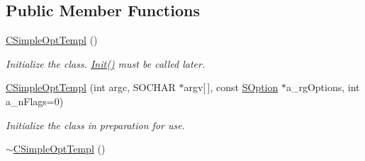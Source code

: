 \subsection*{Public Member Functions}
\begin{DoxyCompactItemize}
\item 
\hypertarget{class_c_simple_opt_templ_a901dd8e44e4b1662dea6991478574517}{\hyperlink{class_c_simple_opt_templ_a901dd8e44e4b1662dea6991478574517}{C\-Simple\-Opt\-Templ} ()}\label{class_c_simple_opt_templ_a901dd8e44e4b1662dea6991478574517}

\begin{DoxyCompactList}\small\item\em Initialize the class. \hyperlink{class_c_simple_opt_templ_a295504063bf4b5cb259541581ee46bfc}{Init()} must be called later. \end{DoxyCompactList}\item 
\hypertarget{class_c_simple_opt_templ_a743811eb95a173a9208c6a6b77298085}{\hyperlink{class_c_simple_opt_templ_a743811eb95a173a9208c6a6b77298085}{C\-Simple\-Opt\-Templ} (int argc, S\-O\-C\-H\-A\-R $\ast$argv\mbox{[}$\,$\mbox{]}, const \hyperlink{struct_c_simple_opt_templ_1_1_s_option}{S\-Option} $\ast$a\-\_\-rg\-Options, int a\-\_\-n\-Flags=0)}\label{class_c_simple_opt_templ_a743811eb95a173a9208c6a6b77298085}

\begin{DoxyCompactList}\small\item\em Initialize the class in preparation for use. \end{DoxyCompactList}\item 
\hypertarget{class_c_simple_opt_templ_afa524c030e4024db99eafb2b4e42f93b}{\hyperlink{class_c_simple_opt_templ_afa524c030e4024db99eafb2b4e42f93b}{$\sim$\-C\-Simple\-Opt\-Templ} ()}\label{class_c_simple_opt_templ_afa524c030e4024db99eafb2b4e42f93b}


\end{DoxyCompactItemize}
